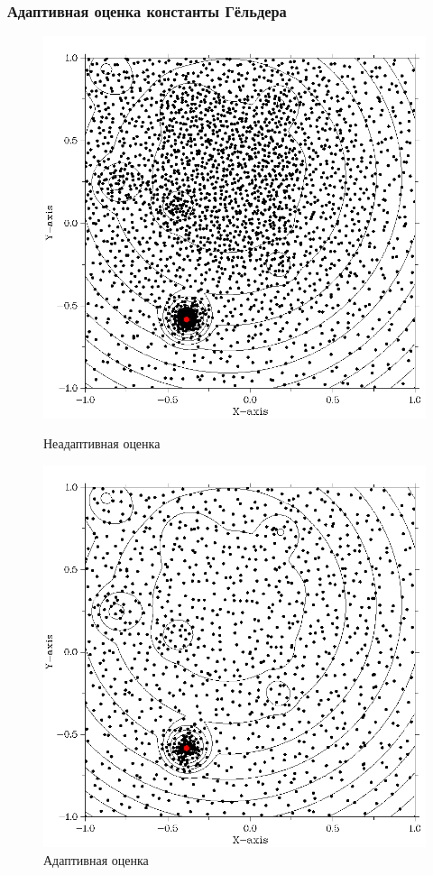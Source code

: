 \documentclass[aspectratio=1610]{beamer}
\begin{document}
\begin{frame}
\frametitle{Адаптивная оценка константы Гёльдера}
  \begin{figure}[ht]
        \begin{minipage}[b]{0.49\linewidth}
            \centering
            \includegraphics[width=\textwidth]{gkls_glob.png}
            \caption*{Неадаптивная оценка}
        \end{minipage}
        \begin{minipage}[b]{0.49\linewidth}
            \centering
            \includegraphics[width=\textwidth]{gkls_loc.png}
            \caption*{Адаптивная оценка}
        \end{minipage}
  \end{figure}
\end{frame}
\end{document}
